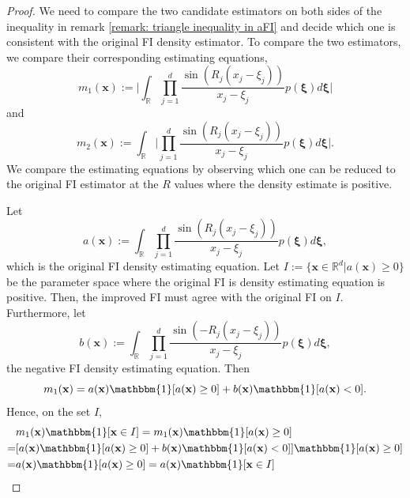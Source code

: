 \documentclass[%
 reprint,
 amsmath,amssymb,
 aps,
]{revtex4-2}
\def\R{\mathbb{R}}
\def\bxi{\boldsymbol{\xi}}
\def\bxi{\boldsymbol{\xi}}
\def\xbold{\mathbf{x}}
\begin{document}
\begin{proof}
    We need to compare the two candidate estimators on both sides of the inequality in remark \ref{remark: triangle inequality in aFI} and decide which one is consistent with the original FI density estimator. To compare the two estimators, we compare their corresponding estimating equations,
    \begin{equation*}
         m_1(\xbold) := \bigg|\int_\R \prod_{j = 1}^d \frac{\sin(R_j(x_j - \xi_j))}{x_j - \xi_j} p(\bxi)d\bxi\bigg|
    \end{equation*}
    and
    \begin{equation*}
        m_2(\xbold) := \int_\R \bigg|\prod_{j = 1}^d \frac{\sin(R_j(x_j - \xi_j))}{x_j - \xi_j} p(\bxi)d\bxi\bigg|.
    \end{equation*}
    We compare the estimating equations by observing which one can be reduced to the original FI estimator at the $R$ values where the density estimate is positive.

    Let
    \begin{equation*}
        a(\xbold) := \int_\R \prod_{j = 1}^d \frac{\sin(R_j(x_j - \xi_j))}{x_j - \xi_j} p(\bxi)d\bxi,
    \end{equation*}
    which is the original FI density estimating equation. Let $I := \{\xbold \in \R^d | a(\xbold) \ge 0\}$ be the parameter space where the original FI is density estimating equation is positive. Then, the improved FI must agree with the original FI on $I$. Furthermore, let
    \begin{equation*}
        b(\xbold) := \int_\R \prod_{j = 1}^d \frac{\sin(-R_j(x_j - \xi_j))}{x_j - \xi_j} p(\bxi)d\bxi,
    \end{equation*}
    the negative FI density estimating equation. Then
    \begin{equation*}
        m_1(\xbold) = a(\xbold)\mathbbm{1}[a(\xbold) \ge 0] + b(\xbold) \mathbbm{1}[a(\xbold) < 0].
    \end{equation*}
    Hence, on the set $I$, 
    \begin{align*}
        & m_1(\xbold)\mathbbm{1}[\xbold \in I] = m_1(\xbold)\mathbbm{1}[a(\xbold) \ge 0] \\
        = & [a(\xbold)\mathbbm{1}[a(\xbold) \ge 0] + b(\xbold) \mathbbm{1}[a(\xbold) < 0]]\mathbbm{1}[a(\xbold) \ge 0] \\
        = & a(\xbold)\mathbbm{1}[a(\xbold) \ge 0] = a(\xbold)\mathbbm{1}[\xbold \in I]
    \end{align*}


\end{proof}
\end{document}
